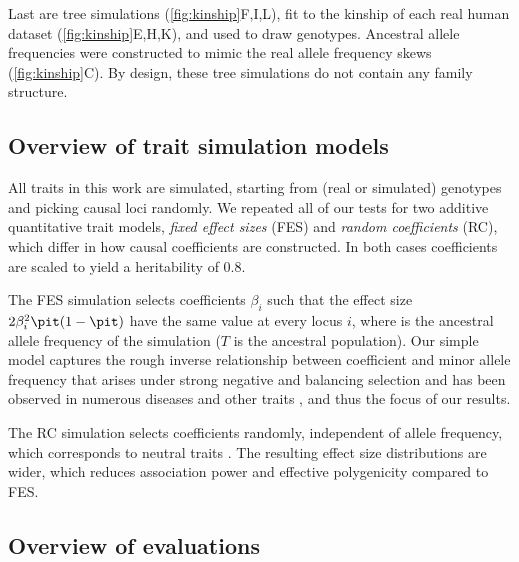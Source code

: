 \documentclass[11pt]{article}
\begin{document}
Last are tree simulations (\cref{fig:kinship}F,I,L), fit to the kinship of each real human dataset (\cref{fig:kinship}E,H,K), and used to draw genotypes.
Ancestral allele frequencies were constructed to mimic the real allele frequency skews (\cref{fig:kinship}C).
By design, these tree simulations do not contain any family structure.

\subsection{Overview of trait simulation models}

All traits in this work are simulated, starting from (real or simulated) genotypes and picking causal loci randomly.
We repeated all of our tests for two additive quantitative trait models, \textit{fixed effect sizes} (FES) and \textit{random coefficients} (RC), which differ in how causal coefficients are constructed.
In both cases coefficients are scaled to yield a heritability of 0.8.

The FES simulation selects coefficients $\beta_i$ such that the effect size $2 \beta_i^2 \pit ( 1 - \pit )$ have the same value at every locus $i$, where \pit is the ancestral allele frequency of the simulation ($T$ is the ancestral population).
Our simple model captures the rough inverse relationship between coefficient and minor allele frequency that arises under strong negative and balancing selection and has been observed in numerous diseases and other traits \citep{park_distribution_2011, zeng_signatures_2018, simons_population_2018, oconnor_extreme_2019}, and thus the focus of our results.

The RC simulation selects coefficients randomly, independent of allele frequency, which corresponds to neutral traits \citep{zeng_signatures_2018, simons_population_2018}.
The resulting effect size distributions are wider, which reduces association power and effective polygenicity compared to FES.

\subsection{Overview of evaluations}
\end{document}
